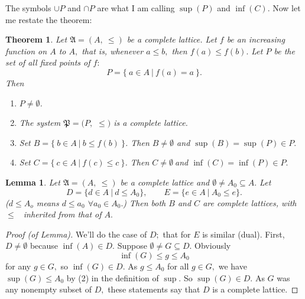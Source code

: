 \documentclass[12pt]{article}
\newtheorem{lemma}{Lemma}
\newtheorem{theorem}{Theorem}
\numberwithin{equation}{section}
\begin{document}
The symbols $\cup P$ and $\cap P$ are what I am calling $\sup(P)$ and
$\inf(C).$ Now let me restate the theorem:

\begin{theorem}
Let $\mathfrak{A}=(A,\ \leq)$ be a complete lattice. Let $f$ be an increasing
function on $A$ to $A,$ that is, whenever $a\leq b,$ then $f(a)\leq f(b).$ Let
$P$ be the set of all fixed points of $f:$
\[
P=\{\ a\in A\ |\ f(a)=a\ \}.
\]
Then

\begin{enumerate}
\item $P\neq\emptyset$.

\item The system $\mathfrak{P}=(P,$ $\leq)$ is a complete lattice.

\item Set $B=\{\ b\in A\ |\ b\leq f(b)\ \}$. Then $B\neq\emptyset$ and
$\sup(B)=\sup(P)\in P.$

\item Set $C=\{\ c\in A\ |\ f(c)\leq c\ \}$. Then $C\neq\emptyset\ $and
$\inf(C)=\inf(P)\in P.$
\end{enumerate}
\end{theorem}

\begin{lemma}
Let $\mathfrak{A}=(A,\ \leq)$ be a complete lattice and $\emptyset\neq
A_{0}\subseteq A.$ Let
\[
D=\{d\in A\ |\ d\leq A_{0}\},\qquad E=\{e\in A\ |\ A_{0}\leq e\}.
\]
($d\leq A_{o}$ means $d\leq a_{0}$ $\forall a_{0}\in A_{0}.$) Then both $B$
and $C$ are complete lattices, with $\leq$ \ inherited from that of $A.$
\end{lemma}

\begin{proof}
[Proof (of Lemma)]We'll do the case of $D;$ that for $E$ is similar (dual).
First, $D\neq\emptyset$ because $\inf(A)\in D.$ Suppose $\emptyset\neq
G\subseteq D.$ Obviously
\[
\inf(G)\leq g\leq A_{0}
\]
for any $g\in G,$ so $\inf(G)\in D.$ As $g\leq A_{0}$ for all $g\in G,$ we
have $\sup(G)\leq A_{0}$ by (2) in the definition of $\sup.$ So $\sup(G)\in
D.$ As $G$ was any nonempty subset of $D,$ these statements say that $D$ is a
complete lattice.
\end{proof}
\end{document}
